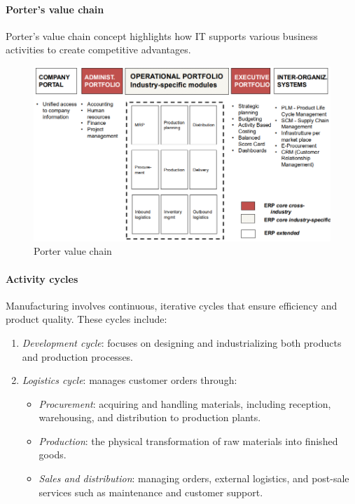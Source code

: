 \paragraph*{Porter's value chain}
Porter’s value chain concept highlights how IT supports various business activities to create competitive advantages.
\begin{figure}[H]
    \centering
    \includegraphics[width=0.5\linewidth]{images/bis1.png}
    \caption{Porter value chain}
\end{figure}

\paragraph*{Activity cycles}
Manufacturing involves continuous, iterative cycles that ensure efficiency and product quality. 
These cycles include:
\begin{enumerate}
    \item \textit{Development cycle}: focuses on designing and industrializing both products and production processes.
    \item \textit{Logistics cycle}: manages customer orders through:
        \begin{itemize}
            \item \textit{Procurement}: acquiring and handling materials, including reception, warehousing, and distribution to production plants.
            \item \textit{Production}: the physical transformation of raw materials into finished goods.
            \item \textit{Sales and distribution}: managing orders, external logistics, and post-sale services such as maintenance and customer support.
        \end{itemize}
\end{enumerate}